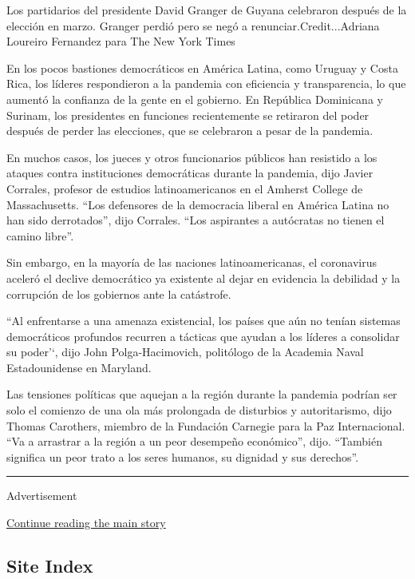 Los partidarios del presidente David Granger de Guyana celebraron
después de la elección en marzo. Granger perdió pero se negó a
renunciar.Credit...Adriana Loureiro Fernandez para The New York Times

En los pocos bastiones democráticos en América Latina, como Uruguay y
Costa Rica, los líderes respondieron a la pandemia con eficiencia y
transparencia, lo que aumentó la confianza de la gente en el gobierno.
En República Dominicana y Surinam, los presidentes en funciones
recientemente se retiraron del poder después de perder las elecciones,
que se celebraron a pesar de la pandemia.

En muchos casos, los jueces y otros funcionarios públicos han resistido
a los ataques contra instituciones democráticas durante la pandemia,
dijo Javier Corrales, profesor de estudios latinoamericanos en el
Amherst College de Massachusetts. ``Los defensores de la democracia
liberal en América Latina no han sido derrotados'', dijo Corrales. ``Los
aspirantes a autócratas no tienen el camino libre''.

Sin embargo, en la mayoría de las naciones latinoamericanas, el
coronavirus aceleró el declive democrático ya existente al dejar en
evidencia la debilidad y la corrupción de los gobiernos ante la
catástrofe.

``Al enfrentarse a una amenaza existencial, los países que aún no tenían
sistemas democráticos profundos recurren a tácticas que ayudan a los
líderes a consolidar su poder'`, dijo John Polga-Hacimovich, politólogo
de la Academia Naval Estadounidense en Maryland.

Las tensiones políticas que aquejan a la región durante la pandemia
podrían ser solo el comienzo de una ola más prolongada de disturbios y
autoritarismo, dijo Thomas Carothers, miembro de la Fundación Carnegie
para la Paz Internacional. ``Va a arrastrar a la región a un peor
desempeño económico'', dijo. ``También significa un peor trato a los
seres humanos, su dignidad y sus derechos''.

\begin{center}\rule{0.5\linewidth}{\linethickness}\end{center}

Advertisement

\protect\hyperlink{after-bottom}{Continue reading the main story}

\hypertarget{site-index}{%
\subsection{Site Index}\label{site-index}}

